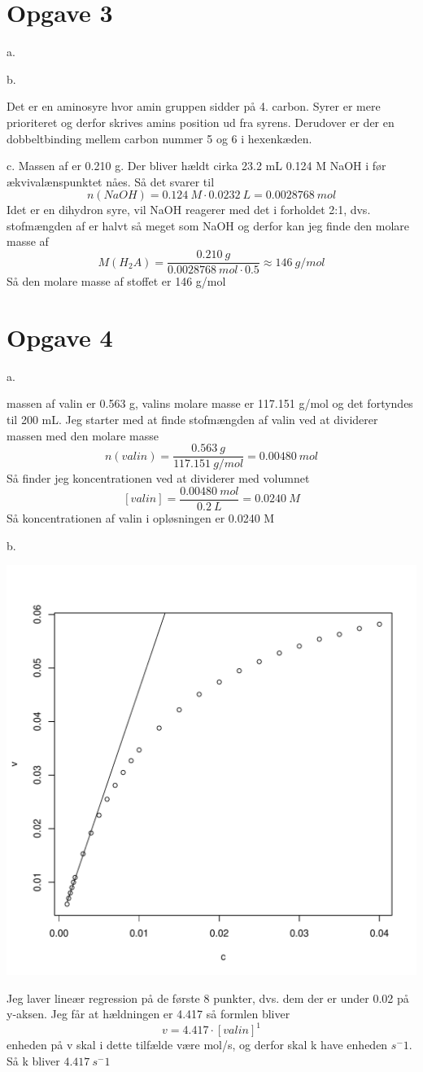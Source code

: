 \documentclass[12pt]{article}
\begin{document}
\section*{Opgave 3}

a.


b.

Det er en aminosyre hvor amin gruppen sidder på 4. carbon. Syrer er mere prioriteret og derfor
skrives amins position ud fra syrens. Derudover er der en dobbeltbinding mellem carbon nummer 5 og 6 i hexenkæden.

c.
Massen af  er 0.210 g. Der bliver hældt cirka 23.2 mL 0.124 M NaOH i før ækvivalænspunktet nåes. Så det svarer til
$$n(NaOH) = 0.124\ M \cdot 0.0232\ L = 0.0028768\ mol$$
Idet  er en dihydron syre, vil NaOH reagerer med det i forholdet 2:1, dvs. stofmængden af  er halvt så meget som
NaOH og derfor kan jeg finde den molare masse af 
$$M(H_2 A) = \frac{0.210\ g}{0.0028768\ mol \cdot 0.5} \approx 146\ g/mol$$
Så den molare masse af stoffet er 146 g/mol

\section*{Opgave 4}

a.

massen af valin er 0.563 g, valins molare masse er 117.151 g/mol og det fortyndes til 200 mL.
Jeg starter med at finde stofmængden af valin ved at dividerer massen med den molare masse
$$n(valin) = \frac{0.563\ g}{117.151\ g/mol} = 0.00480\ mol$$
Så finder jeg koncentrationen ved at dividerer med volumnet
$$[valin] = \frac{0.00480\ mol}{0.2\ L} = 0.0240\ M$$
Så koncentrationen af valin i opløsningen er 0.0240 M

b.

\includegraphics[width=\textwidth]{kemi2.pdf}

Jeg laver lineær regression på de første 8 punkter, dvs. dem der er under 0.02 på y-aksen. Jeg får
at hældningen er 4.417 så formlen bliver
$$v = 4.417\cdot [valin]^1$$
enheden på v skal i dette tilfælde være mol/s, og derfor skal k have enheden $s^-1$.
Så k bliver $4.417\ s^-1$
\end{document}
